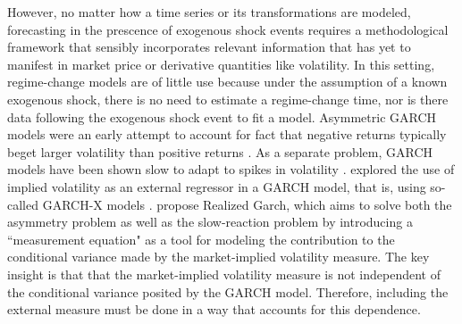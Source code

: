 \documentclass[11pt]{article}
\theoremstyle{definition}
\begin{document}

However, no matter how a time series or its transformations are modeled, forecasting in the prescence of exogenous shock events requires a methodological framework that sensibly incorporates relevant information that has yet to manifest in market price or derivative quantities like volatility.  In this setting, regime-change models are of little use because under the assumption of a known exogenous shock, there is no need to estimate a regime-change time, nor is there data following the exogenous shock event to fit a model.  Asymmetric GARCH models were an early attempt to account for fact that negative returns typically beget larger volatility than positive returns \citep{hansen2012realized}.  As a separate problem, GARCH models have been shown slow to adapt to spikes in volatility \citep{andersen2003modeling}.  \citet{engle2002new} explored the use of implied volatility as an external regressor in a GARCH model, that is, using so-called GARCH-X models \citep{RePEc:pra:mprapa:100301}. \citet{hansen2012realized} propose Realized Garch, which aims to solve both the asymmetry problem as well as the slow-reaction problem by introducing a ``measurement equation" as a tool for modeling the contribution to the conditional variance made by the market-implied volatility measure.  The key insight is that that the market-implied volatility measure is not independent of the conditional variance posited by the GARCH model.  Therefore, including the external measure must be done in a way that accounts for this dependence.
\end{document}

